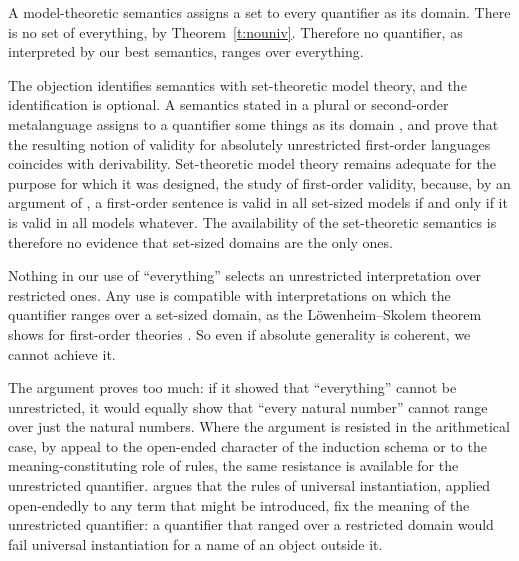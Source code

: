 \documentclass{situationist-preprint}
\begin{document}
\begin{objection}[Semantics]
A model-theoretic semantics assigns a set to every quantifier as its domain. There is no set of everything, by Theorem~\ref{t:nouniv}. Therefore no quantifier, as interpreted by our best semantics, ranges over everything.
\end{objection}

\begin{reply}
The objection identifies semantics with set-theoretic model theory, and the identification is optional. A semantics stated in a plural or second-order metalanguage assigns to a quantifier some things as its domain \citep{Boolos1985,RayoUzquiano1999}, and \citet{RayoWilliamson2003} prove that the resulting notion of validity for absolutely unrestricted first-order languages coincides with derivability. Set-theoretic model theory remains adequate for the purpose for which it was designed, the study of first-order validity, because, by an argument of \citet{Kreisel1967}, a first-order sentence is valid in all set-sized models if and only if it is valid in all models whatever. The availability of the set-theoretic semantics is therefore no evidence that set-sized domains are the only ones.
\end{reply}

\begin{objection}[Indeterminacy]
Nothing in our use of \enquote{everything} selects an unrestricted interpretation over restricted ones. Any use is compatible with interpretations on which the quantifier ranges over a set-sized domain, as the L\"owenheim--Skolem theorem shows for first-order theories \citep{Putnam1980}. So even if absolute generality is coherent, we cannot achieve it.
\end{objection}

\begin{reply}
The argument proves too much: if it showed that \enquote{everything} cannot be unrestricted, it would equally show that \enquote{every natural number} cannot range over just the natural numbers. Where the argument is resisted in the arithmetical case, by appeal to the open-ended character of the induction schema or to the meaning-constituting role of rules, the same resistance is available for the unrestricted quantifier. \citet{McGee2000} argues that the rules of universal instantiation, applied open-endedly to any term that might be introduced, fix the meaning of the unrestricted quantifier: a quantifier that ranged over a restricted domain would fail universal instantiation for a name of an object outside it.
\end{reply}
\end{document}
